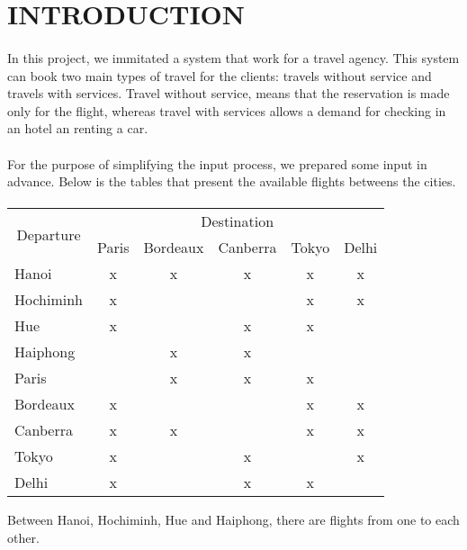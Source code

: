 \section{INTRODUCTION}

\paragraph{}
In this project, we immitated a system that work for a travel agency. This system can book two main types of travel for the clients: travels without service and travels with services. Travel without service, means that the reservation is made only for the flight, whereas travel with services allows a demand for checking in an hotel an renting a car.

\paragraph{}
For the purpose of simplifying the input process, we prepared some input in advance. Below is the tables that present the available flights betweens the cities.

\paragraph{}
\begin{table}[h]
\centering
\begin{tabular}{|l|c|c|c|c|c|}
\hline
\multicolumn{1}{|c|}{\multirow{2}{*}{Departure}} & \multicolumn{5}{c|}{Destination} \\ \cline{2-6} 
\multicolumn{1}{|c|}{} & \multicolumn{1}{l|}{Paris} & \multicolumn{1}{l|}{Bordeaux} & \multicolumn{1}{l|}{Canberra} & \multicolumn{1}{l|}{Tokyo} & \multicolumn{1}{l|}{Delhi} \\ \hline
Hanoi & x & x & x & x & x \\ \hline
Hochiminh & x &  &  & x & x \\ \hline
Hue & x &  & x & x &  \\ \hline
Haiphong &  & x & x &  &  \\ \hline
Paris &  & x & x & x &  \\ \hline
Bordeaux & x &  &  & x & x \\ \hline
Canberra & x & x &  & x & x \\ \hline
Tokyo & x &  & x &  & x \\ \hline
Delhi & x &  & x & x &  \\ \hline
\end{tabular}
\end{table}

Between Hanoi, Hochiminh, Hue and Haiphong, there are flights from one to each other. 
